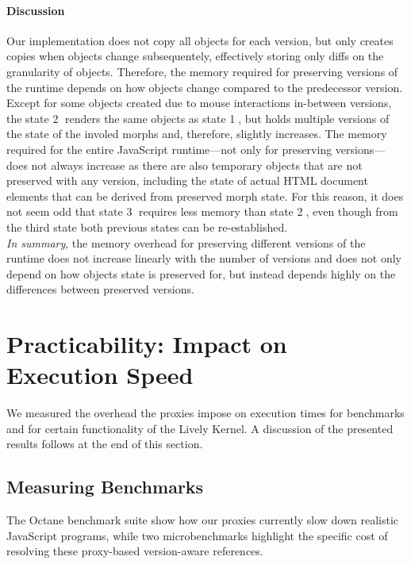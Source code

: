 \paragraph{Discussion}
Our implementation does not copy all objects for each version, but only creates copies when objects change subsequentely, effectively storing only diffs on the granularity of objects.
Therefore, the memory required for preserving versions of the runtime depends on how objects change compared to the predecessor version.
Except for some objects created due to mouse interactions in-between versions, the state \textcircled{2} renders the same objects as state \textcircled{1}, but holds multiple versions of the state of the involed morphs and, therefore, slightly increases.
The memory required for the entire JavaScript runtime---not only for preserving versions---does not always increase as there are also temporary objects that are not preserved with any version, including the state of actual HTML document elements that can be derived from preserved morph state.
For this reason, it does not seem odd that state \textcircled{3} requires less memory than state \textcircled{2}, even though from the third state both previous states can be re-established.\\
\emph{In summary}, the memory overhead for preserving different versions of the runtime does not increase linearly with the number of versions and does not only depend on how objects state is preserved for, but instead depends highly on the differences between preserved versions.



\section{Practicability: Impact on Execution Speed} \label{sec:DISCUSSION:3}

We measured the overhead the proxies impose on execution times for benchmarks and for certain functionality of the Lively Kernel.
A discussion of the presented results follows at the end of this section.


\subsection{Measuring Benchmarks}

The Octane benchmark suite show how our proxies currently slow down realistic JavaScript programs, while two microbenchmarks highlight the specific cost of resolving these proxy-based version-aware references.

